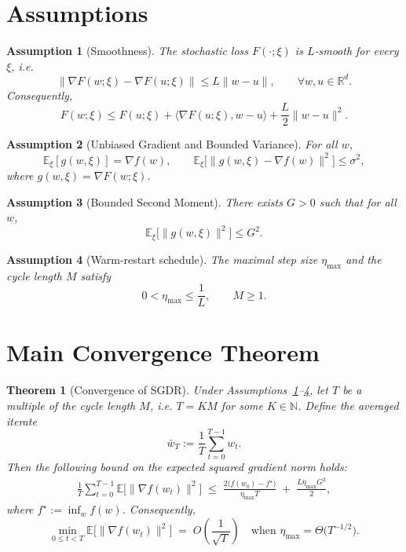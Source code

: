 \documentclass{article}
\newtheorem{theorem}{Theorem}
\newtheorem{assumption}{Assumption}
\newcommand{\E}{\mathbb{E}}
\newcommand{\R}{\mathbb{R}}
\begin{document}
\section*{Assumptions}
\begin{assumption}[Smoothness]\label{ass:smooth}
The stochastic loss $F(\cdot;\xi)$ is $L$‑smooth for every $\xi$, i.e.
\[
\|\nabla F(w;\xi)-\nabla F(u;\xi)\| \le L\|w-u\|,\qquad \forall w,u\in\R^d.
\]
Consequently,
\[
F(w;\xi) \le F(u;\xi)+\langle\nabla F(u;\xi),w-u\rangle+\frac{L}{2}\|w-u\|^2.
\]
\end{assumption}

\begin{assumption}[Unbiased Gradient and Bounded Variance]\label{ass:unbiased}
For all $w$, 
\[
\E_{\xi}[g(w,\xi)] = \nabla f(w),\qquad 
\E_{\xi}\bigl[\|g(w,\xi)-\nabla f(w)\|^2\bigr]\le\sigma^2,
\]
where $g(w,\xi)=\nabla F(w;\xi)$.
\end{assumption}

\begin{assumption}[Bounded Second Moment]\label{ass:second}
There exists $G>0$ such that for all $w$,
\[
\E_{\xi}\bigl[\|g(w,\xi)\|^2\bigr]\le G^2.
\]
\end{assumption}

\begin{assumption}[Warm‑restart schedule]\label{ass:schedule}
The maximal step size $\eta_{\max}$ and the cycle length $M$ satisfy
\[
0<\eta_{\max}\le \frac{1}{L},\qquad M\ge 1.
\]
\end{assumption}

\section*{Main Convergence Theorem}
\begin{theorem}[Convergence of SGDR]\label{thm:sgdr}
Under Assumptions~\ref{ass:smooth}–\ref{ass:schedule}, let $T$ be a multiple of the cycle length $M$, i.e. $T=K M$ for some $K\in\mathbb{N}$. Define the averaged iterate
\[
\bar w_T := \frac{1}{T}\sum_{t=0}^{T-1} w_t .
\]
Then the following bound on the expected squared gradient norm holds:
\begin{align}
\frac{1}{T}\sum_{t=0}^{T-1}\E\bigl[\|\nabla f(w_t)\|^2\bigr]
\;\le\;
\frac{2\bigl(f(w_0)-f^\star\bigr)}{\eta_{\max} T}
\;+\;
\frac{L\eta_{\max} G^2}{2},
\tag{1}
\end{align}
where $f^\star:=\inf_{w}f(w)$. Consequently,
\[
\min_{0\le t<T}\E\bigl[\|\nabla f(w_t)\|^2\bigr]
\;=\; O\!\left(\frac{1}{\sqrt{T}}\right)
\quad\text{when }\eta_{\max}= \Theta\!\bigl(T^{-1/2}\bigr).
\]
\end{theorem}
\end{document}
